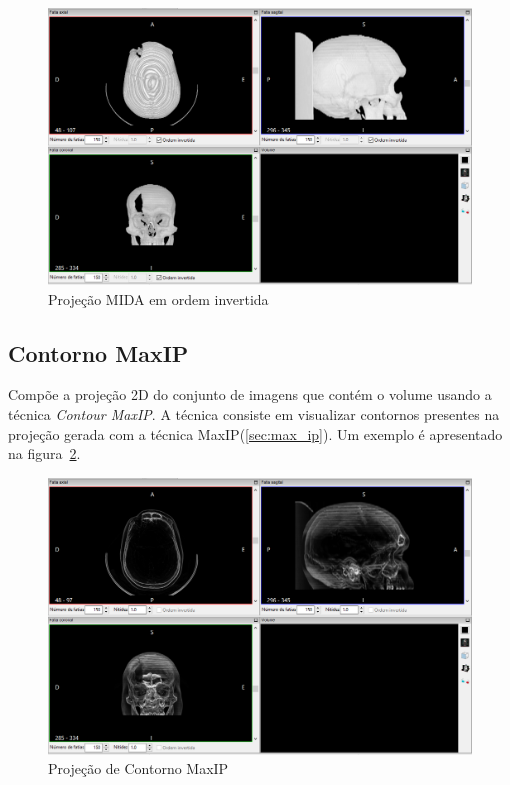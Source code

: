 \begin{figure}[H]
\centering
\includegraphics[scale=0.40]{../user_guide_figures/invesalius_screen/multiplanar_window_mida_inverted_pt.png}
\caption{Projeção MIDA em ordem invertida}
\label{fig:proj_MIDA_inv}
\end{figure}

\subsection{Contorno MaxIP}

Compõe a projeção 2D do conjunto de imagens que contém o volume usando a técnica \textit{Contour MaxIP}. A técnica consiste em visualizar contornos presentes na projeção gerada com a técnica MaxIP(\ref{sec:max_ip}). Um exemplo é apresentado na figura~\ref{fig:proj_contorno_maxip}.

\begin{figure}[H]
\centering
\includegraphics[scale=0.40]{../user_guide_figures/invesalius_screen/multiplanar_window_contour_maxip_pt.png}
\caption{Projeção de Contorno MaxIP}
\label{fig:proj_contorno_maxip}
\end{figure}

